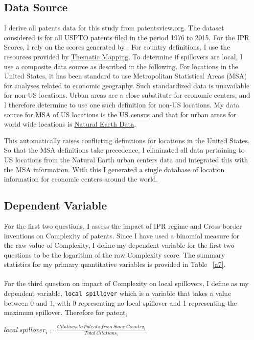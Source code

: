 \documentclass[12pt]{article}
\begin{document}
\subsection{Data Source}
I derive all patents data for this study from patentsview.org. The dataset considered is for all USPTO patents filed in the period 1976 to 2015. For the IPR Scores, I rely on the scores generated by \cite{Lesser2010}. For country definitions, I use the resources provided by \href{http://thematicmapping.org/downloads/world_borders.php}{Thematic Mapping}. To determine if spillovers are local, I use a composite data source as described in the following. For locations in the United States, it has been standard to use Metropolitan Statistical Areas (MSA) for analyses related to economic geography. Such standardized data is unavailable for non-US locations. Urban areas are a close substitute for  economic centers, and I therefore determine to use one such definition for non-US locations. My data source for MSA of US locations is \href{http://www.census.gov/geo/maps-data/data/cbf/cbf_msa.html}{the US census} and that for urban areas for world wide locations is \href{http://www.naturalearthdata.com/downloads/10m-cultural-vectors/}{Natural Earth Data}.
 
This automatically raises conflicting definitions for locations in the United States. So that the MSA definitions take precedence, I eliminated all data pertaining to US locations from the Natural Earth urban centers data and integrated this with the MSA information. With this I  generated a single database of location information for economic centers around the world. 

\subsection{Dependent Variable}
For the first two questions, I assess the impact of IPR regime and Cross-border inventions on Complexity of patents. Since I have used a binomial measure for the raw value of Complexity, I define my dependent variable for the first two questions to be the logarithm of the raw Complexity score. The summary statistics for my primary quantitative variables is provided in Table ~\ref{a7}. 
\\\\
For the third question on impact of Complexity on local spillovers,  I define as my dependent variable, \verb|local spillover| which is a variable that takes a value between 0 and 1, with 0 representing no local spillover and 1 representing the maximum spillover. Therefore for patent$_i$
\begin{center} $ local\ spillover_i = \frac{Citations\ to\ Patents\ from\ Same\ Country_i}{Total\ Citations_i}$\end{center}
\end{document}
